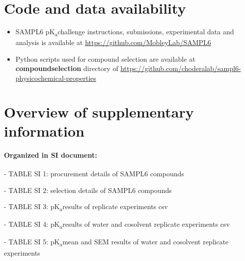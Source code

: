 \documentclass[9pt,lineno]{elife}
\newcommand{\pKa}{pK\textsubscript{a}}
\begin{document}
\section{Code and data availability}
\begin{minipage}{15cm}
\begin{itemize}

\item SAMPL6 \pKa challenge instructions, submissions, experimental data and analysis is available at  \href{https://github.com/MobleyLab/SAMPL6}{https://github.com/MobleyLab/SAMPL6}

\item Python scripts used for compound selection are available at \textbf{compound\textunderscore selection} directory of  
\href{https://github.com/choderalab/sampl6\textendash physicochemical\textendash properties}{https://github.com/choderalab/sampl6-physicochemical-properties}

\end{itemize}
\end{minipage}


\section{Overview of supplementary information}

\paragraph{Organized in SI document:}

- TABLE SI 1: procurement details of SAMPL6 compounds  

- TABLE SI 2: selection details of SAMPL6 compounds  

- TABLE SI 3: \pKa results of replicate experiments csv

- TABLE SI 4: \pKa results of water and cosolvent replicate experiments csv

- TABLE SI 5: \pKa mean and SEM results of water and cosolvent replicate experiments
\end{document}
